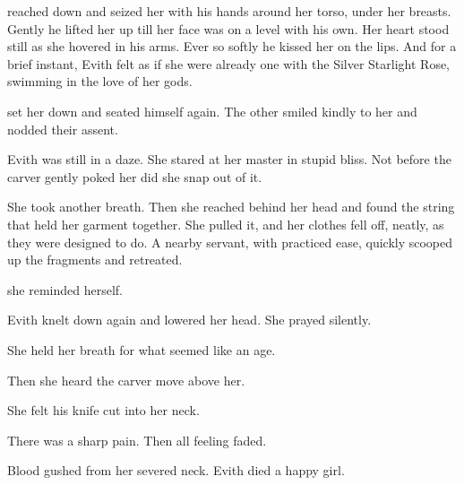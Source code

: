 \Teshrial reached down and seized her with his hands around her torso, under her breasts. 
Gently he lifted her up till her face was on a level with his own. 
Her heart stood still as she hovered in his arms. 
Ever so softly he kissed her on the lips.
And for a brief instant, Evith felt as if she were already one with the Silver Starlight Rose, swimming in the love of her gods. 

\Teshrial set her down and seated himself again.
The other \resphain smiled kindly to her and nodded their assent. 

Evith was still in a daze. 
She stared at her master in stupid bliss. 
Not before the carver gently poked her did she snap out of it. 


She took another breath. 
Then she reached behind her head and found the string that held her garment together.
She pulled it, and her clothes fell off, neatly, as they were designed to do. 
A nearby servant, with practiced ease, quickly scooped up the fragments and retreated. 

 she reminded herself.

Evith knelt down again and lowered her head. 
She prayed silently. 


She held her breath for what seemed like an age. 

Then she heard the carver move above her. 

She felt his knife cut into her neck. 


There was a sharp pain. 
Then all feeling faded. 

Blood gushed from her severed neck.
Evith died a happy girl.



